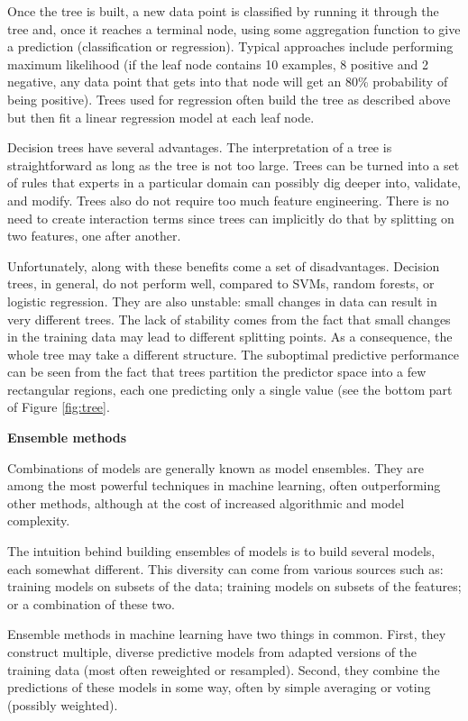 \documentclass[]{krantz}
\begin{document}
Once the tree is built, a new data point is classified by running it
through the tree and, once it reaches a terminal node, using some
aggregation function to give a prediction (classification or
regression). Typical approaches include performing maximum likelihood
(if the leaf node contains 10 examples, 8 positive and 2 negative, any
data point that gets into that node will get an 80\% probability of
being positive). Trees used for regression often build the tree as
described above but then fit a linear regression model at each leaf
node.

Decision trees have several advantages. The interpretation of a tree is
straightforward as long as the tree is not too large. Trees can be
turned into a set of rules that experts in a particular domain can
possibly dig deeper into, validate, and modify. Trees also do not
require too much feature engineering. There is no need to create
interaction terms since trees can implicitly do that by splitting on two
features, one after another.

Unfortunately, along with these benefits come a set of disadvantages.
Decision trees, in general, do not perform well, compared to SVMs,
random forests, or logistic regression. They are also unstable: small
changes in data can result in very different trees. The lack of
stability comes from the fact that small changes in the training data
may lead to different splitting points. As a consequence, the whole tree
may take a different structure. The suboptimal predictive performance
can be seen from the fact that trees partition the predictor space into
a few rectangular regions, each one predicting only a single value (see
the bottom part of Figure \ref{fig:tree}.

\textbf{Ensemble methods}

Combinations of models are generally known as model ensembles. They are
among the most powerful techniques in machine learning, often
outperforming other methods, although at the cost of increased
algorithmic and model complexity.

The intuition behind building ensembles of models is to build several
models, each somewhat different. This diversity can come from various
sources such as: training models on subsets of the data; training models
on subsets of the features; or a combination of these two.

Ensemble methods in machine learning have two things in common. First,
they construct multiple, diverse predictive models from adapted versions
of the training data (most often reweighted or resampled). Second, they
combine the predictions of these models in some way, often by simple
averaging or voting (possibly weighted).
\end{document}
